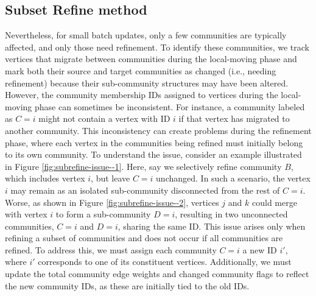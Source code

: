 \subsection{Subset Refine method}
\label{sec:subset-refine-method}

Nevertheless, for small batch updates, only a few communities are typically affected, and only those need refinement. To identify these communities, we track vertices that migrate between communities during the local-moving phase and mark both their source and target communities as changed (i.e., needing refinement) because their sub-community structures may have been altered. However, the community membership IDs assigned to vertices during the local-moving phase can sometimes be inconsistent. For instance, a community labeled as $C = i$ might not contain a vertex with ID $i$ if that vertex has migrated to another community. This inconsistency can create problems during the refinement phase, where each vertex in the communities being refined must initially belong to its own community. To understand the issue, consider an example illustrated in Figure \ref{fig:subrefine-issue--1}. Here, say we selectively refine community $B$, which includes vertex $i$, but leave $C = i$ unchanged. In such a scenario, the vertex $i$ may remain as an isolated sub-community disconnected from the rest of $C = i$. Worse, as shown in Figure \ref{fig:subrefine-issue--2}, vertices $j$ and $k$ could merge with vertex $i$ to form a sub-community $D = i$, resulting in two unconnected communities, $C = i$ and $D = i$, sharing the same ID. This issue arises only when refining a subset of communities and does not occur if all communities are refined. To address this, we must assign each community $C = i$ a new ID $i'$, where $i'$ corresponds to one of its constituent vertices. Additionally, we must update the total community edge weights and changed community flags to reflect the new community IDs, as these are initially tied to the old IDs.




